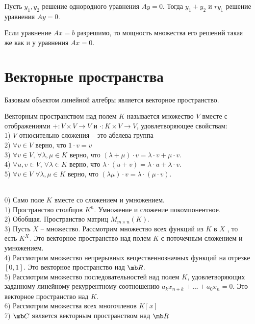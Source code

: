 \endproof
\ecrl

\crl Пусть $y_1,y_2$ решение однородного уравнения $Ay=0$. Тогда $y_1+y_2$  и $ry_1$ решение уравнения $Ay=0$.
\ecrl

\crl Если уравнение $Ax=b$ разрешимо, то мощность множества его решений такая же как и у уравнения $Ax=0$. 
\ecrl





\section{Векторные пространства}

Базовым объектом линейной алгебры является векторное пространство.

Векторным пространством над полем $K$ называется множество $V$ вместе с отображениями $+\colon V\times V \to V$ и $\cdot \colon K \times V \to V$, удовлетворяющее свойствам:\\
1) $V$ относительно сложения -- это абелева группа\\
2) $\forall v \in V$ верно, что $1\cdot v=v$\\
3) $\forall v \in V$, $\forall \lambda, \mu \in K$ верно, что $(\lambda+\mu)\cdot v= \lambda\cdot v + \mu \cdot v$.\\
4) $\forall u,v \in V$, $\forall \lambda \in K$ верно, что $\lambda\cdot(u+v)= \lambda\cdot u + \lambda \cdot v$.\\
5) $\forall v \in V$ $\forall \lambda, \mu \in K$ верно, что $(\lambda\mu)\cdot v= \lambda\cdot(\mu \cdot v)$.
\edfn





\exm\\
0) Само поле $K$ вместе со сложением и умножением.\\
1) Пространство столбцов $K^n$. Умножение и сложение покомпонентное.\\
2) Обобщая. Пространство матриц $M_{m\times n}(K)$.\\
3) Пусть $X$ -- множество. Рассмотрим множество всех функций  из $K$ в $X$ , то есть $K^X$. Это векторное пространство над полем $K$ с поточечным сложением и умножением.\\
4) Рассмотрим множество непрерывных вещественнозначных функций на отрезке $[0,1]$. Это векторное пространство над $\mb R$.\\
5) Рассмотрим множество последовательностей над полем $K$, удовлетворяющих заданному линейному рекуррентному соотношению $a_k x_{n+k}+\dots+a_0x_n=0$. Это векторное пространство над $K$.\\
6) Рассмотрим множества всех многочленов $K[x]$\\
7) $\mb C$ является векторным пространством над $\mb R$\\




